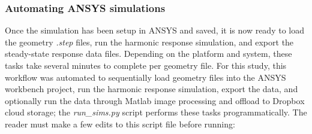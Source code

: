 \documentclass[11pt,letterpaper]{article}
\begin{document}
			\subsubsection{Automating ANSYS simulations}
			Once the simulation has been setup in ANSYS and saved, it is now ready to load the geometry \textit{.step} files, run the harmonic response simulation, and export the steady-state response data files. Depending on the platform and system, these tasks take several minutes to complete per geometry file. For this study, this workflow was automated to sequentially load geometry files into the ANSYS workbench project, run the harmonic response simulation, export the data, and optionally run the data through Matlab image processing and offload to Dropbox cloud storage; the \textit{run\_sims.py} script performs these tasks programmatically. The reader must make a few edits to this script file before running:
\end{document}
